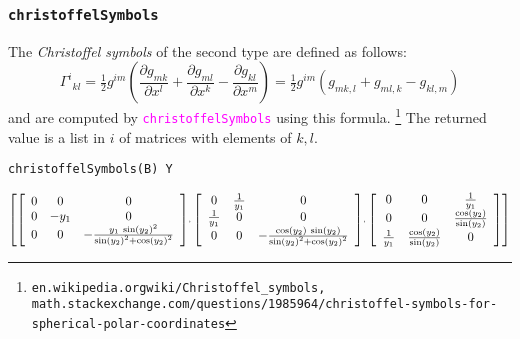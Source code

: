 \documentclass[12pt,a4paper]{article}
\newcommand{\spadfun}[1]{\textcolor{magenta}{\tt #1}}
\begin{document}
\subsubsection{\tt christoffelSymbols}
The {\em Christoffel symbols} of the second type are defined as
follows:
\begin{displaymath}
\Gamma ^{i}{}_{kl}=
{\tfrac {1}{2}}g^{im}\left({\frac {\partial g_{mk}}{\partial x^{l}}}+
{\frac {\partial g_{ml}}{\partial x^{k}}}-{\frac {\partial g_{kl}}
{\partial x^{m}}}\right)={\tfrac {1}{2}}g^{im}(g_{mk,l}+g_{ml,k}-
g_{kl,m})
\end{displaymath}
and are computed by \spadfun{christoffelSymbols} using this formula.
\footnote{\tiny\tt en.wikipedia.org\/wiki/Christoffel\_symbols,\\
math.stackexchange.com/questions/1985964/christoffel-symbols-for-spherical-polar-coordinates}
The returned value is a list in $i$ of matrices with elements of $k,l$.
\begin{lstlisting}
christoffelSymbols(B) Y
\end{lstlisting}
\begin{displaymath}
{\scriptscriptstyle
\left[
{\left[ 
\begin{array}{ccc}
0 & 0 & 0 \\ 
0 & -{y \sb {1}} & 0 \\ 
0 & 0 & -{{{y \sb {1}} \  {{{\sin 
\left(
{{y \sb {2}}} 
\right)}}
\sp {2}}} \over {{{{\sin 
\left(
{{y \sb {2}}} 
\right)}}
\sp {2}}+{{{\cos 
\left(
{{y \sb {2}}} 
\right)}}
\sp {2}}}} 
\end{array}
\right]},
\: {\left[ 
\begin{array}{ccc}
0 & {1 \over {y \sb {1}}} & 0 \\ 
{1 \over {y \sb {1}}} & 0 & 0 \\ 
0 & 0 & -{{{\cos 
\left(
{{y \sb {2}}} 
\right)}
\  {\sin 
\left(
{{y \sb {2}}} 
\right)}}
\over {{{{\sin 
\left(
{{y \sb {2}}} 
\right)}}
\sp {2}}+{{{\cos 
\left(
{{y \sb {2}}} 
\right)}}
\sp {2}}}} 
\end{array}
\right]} ,   
\: {\left[ 
\begin{array}{ccc}
0 & 0 & {1 \over {y \sb {1}}} \\ 
0 & 0 & {{\cos 
\left(
{{y \sb {2}}} 
\right)}
\over {\sin 
\left(
{{y \sb {2}}} 
\right)}}
\\ 
{1 \over {y \sb {1}}} & {{\cos 
\left(
{{y \sb {2}}} 
\right)}
\over {\sin 
\left(
{{y \sb {2}}} 
\right)}}
& 0 
\end{array}
\right]}
\right] }
\end{displaymath}
\end{document}
